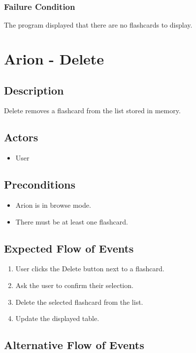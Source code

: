 \documentclass{scrreprt}
\begin{document}
    \subsection{Failure Condition}
    The program displayed that there are no flashcards to display.


\chapter{Arion - Delete}

\section{Description}
Delete removes a flashcard from the list stored in memory.

\section{Actors}
\begin{itemize}
    \item User
\end{itemize}

\section{Preconditions}
\begin{itemize}
    \item Arion is in browse mode.
    \item There must be at least one flashcard.
\end{itemize}

\section{Expected Flow of Events}
\begin{enumerate}[1.]
    \item User clicks the Delete button next to a flashcard.
    \item Ask the user to confirm their selection.
    \item Delete the selected flashcard from the list.
    \item Update the displayed table.
\end{enumerate}

\section{Alternative Flow of Events}
\end{document}
